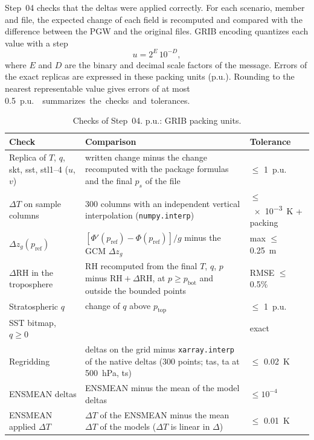 \documentclass[11pt,a4paper]{article}
\newcommand{\code}[1]{\texttt{#1}}
\newcommand{\dT}{\Delta T}
\newcommand{\dRH}{\Delta \mathrm{RH}}
\begin{document}
Step~04 checks that the deltas were applied correctly. For each scenario,
member and file, the expected change of each field is recomputed and compared
with the difference between the PGW and the original files. GRIB encoding
quantizes each value with a step
\begin{equation}
  u = 2^{E}\,10^{-D},
\end{equation}
where $E$ and $D$ are the binary and decimal scale factors of the message.
Errors of the exact replicas are expressed in these packing units (p.u.).
Rounding to the nearest representable value gives errors of at most
\SI{0.5}{p.u.}  summarizes the checks and tolerances.

\begin{table}[htbp]
\centering
\caption{Checks of Step~04. p.u.: GRIB packing units.}
\label{tab:checks}
\small
\begin{tabularx}{\linewidth}{lXl}
\toprule
Check & Comparison & Tolerance \\
\midrule
Replica of $T$, $q$, skt, sst, stl1--4 ($u$, $v$) & written change minus the
  change recomputed with the package formulas and the final $p_s$ of the file & $\le$ \SI{1}{p.u.} \\
$\dT$ on sample columns & 300 columns with an independent vertical
  interpolation (\code{numpy.interp}) & $\le$ \SI{e-3}{K} + packing \\
$\Delta z_g(p_{\mathrm{ref}})$ & $[\Phi'(p_{\mathrm{ref}}) - \Phi(p_{\mathrm{ref}})]/g$
  minus the GCM $\Delta z_g$ & max $\le$ \SI{0.25}{m} \\
$\dRH$ in the troposphere & RH recomputed from the final $T$, $q$, $p$ minus
  $\mathrm{RH} + \dRH$, at $p \ge p_{\mathrm{bot}}$ and outside the bounded points & RMSE $\le$ 0.5\% \\
Stratospheric $q$ & change of $q$ above $p_{\mathrm{top}}$ & $\le$ \SI{1}{p.u.} \\
SST bitmap, $q \ge 0$ & & exact \\
Regridding & deltas on the grid minus \code{xarray.interp} of the native
  deltas (300 points; tas, ta at \SI{500}{hPa}, ts) & $\le$ \SI{0.02}{K} \\
ENSMEAN deltas & ENSMEAN minus the mean of the model deltas & $\le 10^{-4}$ \\
ENSMEAN applied $\dT$ & $\dT$ of the ENSMEAN minus the mean $\dT$ of the
  models ($\dT$ is linear in $\Delta$) & $\le$ \SI{0.01}{K} \\
\bottomrule
\end{tabularx}
\end{table}
\end{document}
